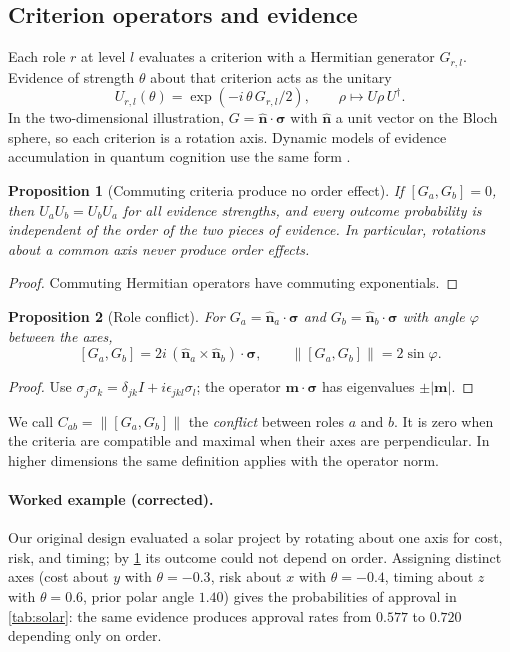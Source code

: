 \documentclass[11pt]{article}
\newtheorem{proposition}{Proposition}
\theoremstyle{definition}
\theoremstyle{remark}
\newcommand{\nvec}{\hat{\boldsymbol{n}}}
\newcommand{\bsig}{\boldsymbol{\sigma}}
\begin{document}
\subsection{Criterion operators and evidence}
Each role $r$ at level $l$ evaluates a criterion with a Hermitian generator $G_{r,l}$. Evidence of strength $\theta$ about that criterion acts as the unitary
\begin{equation}
U_{r,l}(\theta)=\exp(-i\,\theta\, G_{r,l}/2),\qquad \rho\mapsto U\rho\,U^\dagger .
\label{eq:evidence}
\end{equation}
In the two-dimensional illustration, $G=\nvec\cdot\bsig$ with $\nvec$ a unit vector on the Bloch sphere, so each criterion is a rotation axis. Dynamic models of evidence accumulation in quantum cognition use the same form \citep{busemeyer2006}.

\begin{proposition}[Commuting criteria produce no order effect]
\label{prop:commute}
If $[G_a,G_b]=0$, then $U_aU_b=U_bU_a$ for all evidence strengths, and every outcome probability is independent of the order of the two pieces of evidence. In particular, rotations about a common axis never produce order effects.
\end{proposition}
\begin{proof}
Commuting Hermitian operators have commuting exponentials.
\end{proof}

\begin{proposition}[Role conflict]
\label{prop:comm}
For $G_a=\nvec_a\cdot\bsig$ and $G_b=\nvec_b\cdot\bsig$ with angle $\varphi$ between the axes,
\[
[G_a,G_b]=2i\,(\nvec_a\times\nvec_b)\cdot\bsig,\qquad \big\|[G_a,G_b]\big\|=2\sin\varphi .
\]
\end{proposition}
\begin{proof}
Use $\sigma_j\sigma_k=\delta_{jk}I+i\epsilon_{jkl}\sigma_l$; the operator $\boldsymbol{m}\cdot\bsig$ has eigenvalues $\pm|\boldsymbol{m}|$.
\end{proof}

We call $C_{ab}=\|[G_a,G_b]\|$ the \emph{conflict} between roles $a$ and $b$. It is zero when the criteria are compatible and maximal when their axes are perpendicular. In higher dimensions the same definition applies with the operator norm.

\paragraph{Worked example (corrected).} Our original design evaluated a solar project by rotating about one axis for cost, risk, and timing; by \cref{prop:commute} its outcome could not depend on order. Assigning distinct axes (cost about $y$ with $\theta=-0.3$, risk about $x$ with $\theta=-0.4$, timing about $z$ with $\theta=0.6$, prior polar angle $1.40$) gives the probabilities of approval in \cref{tab:solar}: the same evidence produces approval rates from $0.577$ to $0.720$ depending only on order.
\end{document}
